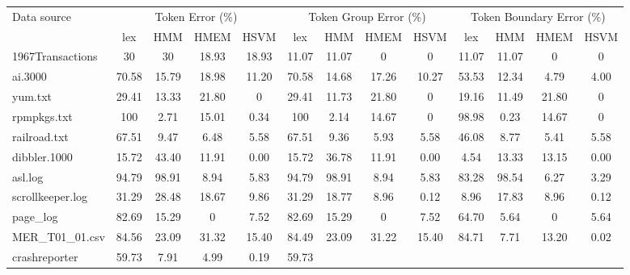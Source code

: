 \begin{table}[th]
\begin{center}
\begin{tabular}{|l||c|c|c|c||c|c|c|c||c|c|c|c|} \hline
Data source        & \multicolumn{4}{|c||}{Token Error (\%)} &
               \multicolumn{4}{|c||}{Token Group Error (\%)} &
               \multicolumn{4}{|c|}{Token Boundary Error (\%)} \\ \cline{2-13}
               & lex   & HMM   & HMEM  & HSVM & lex & HMM & HMEM &
               HSVM & lex & HMM & HMEM & HSVM \\\hline\hline
1967Transactions     & 30    & 30    & 18.93 & 18.93 & 11.07 &
               11.07 & 0     & 0     & 11.07 & 11.07 & 0     & 0     \\ \hline
ai.3000                    & 70.58 & 15.79 & 18.98 & 11.20 & 70.58 &
               14.68 & 17.26 & 10.27 & 53.53 & 12.34 & 4.79  & 4.00  \\ \hline
yum.txt                    & 29.41 & 13.33 & 21.80 & 0     & 29.41 &
               11.73 & 21.80 & 0     & 19.16 & 11.49 & 21.80 & 0     \\ \hline
rpmpkgs.txt                & 100   & 2.71  & 15.01 & 0.34  & 100   &
               2.14  & 14.67     & 0     & 98.98 & 0.23  & 14.67     & 0     \\ \hline
railroad.txt               & 67.51 & 9.47  & 6.48  & 5.58     &
67.51 &
               9.36  & 5.93  & 5.58     & 46.08 & 8.77  & 5.41  & 5.58     \\ \hline
dibbler.1000               & 15.72 & 43.40     & 11.91     & 0.00 &
15.72 & 36.78
                     & 11.91     & 0.00     & 4.54  & 13.33 & 13.15     & 0.00     \\ \hline
asl.log                    & 94.79 & 98.91 & 8.94  & 5.83  & 94.79 &
               98.91 & 8.94  & 5.83  & 83.28 & 98.54 & 6.27  & 3.29  \\ \hline
scrollkeeper.log           & 31.29 & 28.48 & 18.67 & 9.86  & 31.29 &
               18.77 & 8.96  & 0.12  & 8.96  & 17.83 & 8.96  & 0.12  \\ \hline
page\_log                  & 82.69 & 15.29 & 0     & 7.52  & 82.69 &
               15.29 & 0     & 7.52  & 64.70 & 5.64  & 0     & 5.64  \\ \hline
MER\_T01\_01.csv           & 84.56 & 23.09 & 31.32 & 15.40     &
84.49 &
               23.09 & 31.22 & 15.40     & 84.71 & 7.71  & 13.20 & 0.02 \\ \hline
crashreporter          & 59.73 & 7.91     & 4.99  & 0.19  & 59.73 &

\end{tabular}
\end{center}
\end{table}
